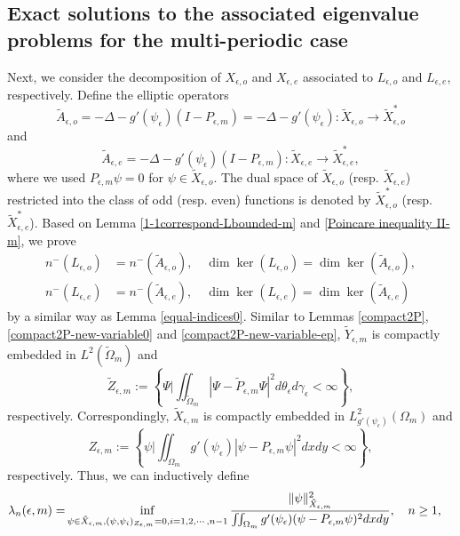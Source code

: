 \documentclass[1 [leqno, 11pt]{amsart}
\numberwithin{equation}{section}
\let\ep=\epsilon
\begin{document}
\begin{CJK*}{GBK}{song}
\subsection{Exact solutions to the associated eigenvalue problems  for the multi-periodic case}
Next, we consider the decomposition of $X_{\ep, o}$ and $X_{\ep, e}$ associated to $L_{\ep,o}$ and $L_{\ep,e}$, respectively.
Define the elliptic operators
$$\tilde{A}_{\ep,o} = -\Delta - g'(\psi_\ep)(I-P_{\ep,m}) =  -\Delta - g'(\psi_\ep): \tilde{X}_{\ep, o} \rightarrow \tilde{X}_{\ep, o}^*$$
and
$$\tilde{A}_{\ep,e} = -\Delta - g'(\psi_\ep)(I-P_{\ep,m}): \tilde{X}_{\ep, e} \rightarrow \tilde{X}_{\ep, e}^*,$$
where we used $P_{\ep,m}\psi=0$ for $\psi\in\tilde{X}_{\ep, o}$.
The dual space of  $\tilde X_{\ep, o}$ (resp. $\tilde X_{\ep, e}$)  restricted into the class of odd (resp. even) functions is denoted  by $\tilde X_{\ep, o}^*$ (resp. $\tilde X_{\ep, e}^*$).
Based on Lemma \ref{1-1correspond-Lbounded-m} and  \eqref{Poincare inequality II-m}, we  prove
\begin{align}\label{n-ker-o}
n^-(L_{\ep,o}) &= n^-(\tilde A_{\ep,o}), \quad \dim \ker(L_{\ep,o}) = \dim \ker(\tilde A_{\ep,o}),\\\label{n-ker-e}
n^-(L_{\ep,e}) & = n^-(\tilde A_{\ep,e}), \quad \dim \ker(L_{\ep,e}) = \dim \ker(\tilde A_{\ep,e})
\end{align}
by a similar way as  Lemma \ref{equal-indices0}. Similar to Lemmas \ref{compact2P}, \ref{compact2P-new-variable0} and \ref{compact2P-new-variable-ep},
 $\tilde Y_{\ep,m}$ is compactly embedded in $L^2(\tilde \Omega_{m})$ and
$$
 \tilde Z_{\ep,m}:=\left\{\Psi\bigg|\iint_{\tilde \Omega_{m}}|\Psi-\tilde P_{\ep,m}\Psi|^2d\theta_\ep d\gamma_\ep<\infty\right\},
 $$
respectively. Correspondingly,
 $\tilde X_{\ep,m}$ is compactly embedded in $L_{g'(\psi_\ep)}^2(\Omega_m)$ and
$$
 Z_{\ep,m}:=\left\{\psi\bigg|\iint_{\Omega_m}g'(\psi_\ep)|\psi-P_{\ep,m}\psi|^2dxdy<\infty\right\},
$$
respectively.
Thus,  we can
inductively define
\begin{align}\label{variational problem2-ep-m}
\lambda_n(\ep,m)=& \inf_{\psi \in \tilde X_{\ep,m}, (\psi, \psi_{i})_{Z_{\ep,m}} = 0, i = 1, 2, \cdots, n-1}{\|\psi\|_{\tilde{X}_{\ep,m}}^2\over\iint_{\Omega_m} g'(\psi_\ep)(\psi - P_{\ep,m}\psi)^2dxdy},\quad n\geq1,
\end{align}

\end{CJK*}
\end{document}
